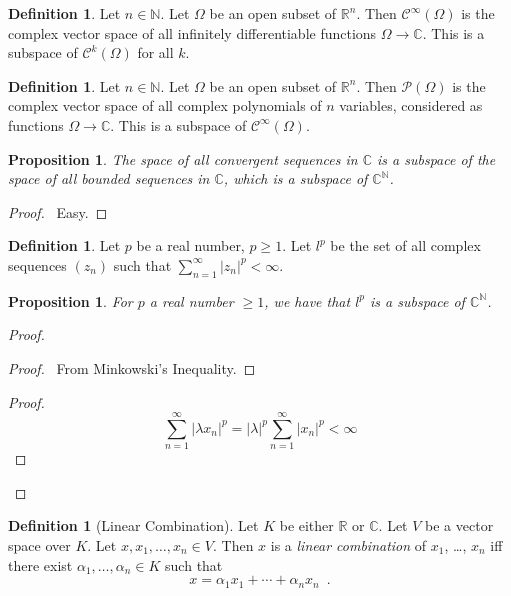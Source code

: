 \documentclass{book}
\let\qed\relax
\newtheorem{prop}[ax]{Proposition}
\theoremstyle{definition}
\newtheorem{df}[ax]{Definition}
\begin{document}
\begin{df}
Let $n \in \mathbb{N}$. Let $\Omega$ be an open subset of $\mathbb{R}^n$. Then $\mathcal{C}^\infty(\Omega)$ is the complex vector space of all infinitely differentiable functions $\Omega \rightarrow \mathbb{C}$. This is a subspace of $\mathcal{C}^k(\Omega)$ for all $k$.
\end{df}

\begin{df}
Let $n \in \mathbb{N}$. Let $\Omega$ be an open subset of $\mathbb{R}^n$. Then $\mathcal{P}(\Omega)$ is the complex vector space of all complex polynomials of $n$ variables, considered as functions $\Omega \rightarrow \mathbb{C}$. This is a subspace of $\mathcal{C}^\infty(\Omega)$.
\end{df}

\begin{prop}
The space of all convergent sequences in $\mathbb{C}$ is a subspace of the space of all bounded sequences in $\mathbb{C}$, which is a subspace of $\mathbb{C}^\mathbb{N}$.
\end{prop}

\begin{proof}
\pf\ Easy. \qed
\end{proof}

\begin{df}
Let $p$ be a real number, $p \geq 1$. Let $l^p$ be the set of all complex sequences $(z_n)$ such that $\sum_{n=1}^\infty |z_n|^p < \infty$.
\end{df}

\begin{prop}
For $p$ a real number $\geq 1$, we have that $l^p$ is a subspace of $\mathbb{C}^\mathbb{N}$.
\end{prop}

\begin{proof}
\pf
{}
\begin{proof}
	\pf\ From Minkowski's Inequality.
\end{proof}
\begin{proof}
	\pf
	\[ \sum_{n=1}^\infty |\lambda x_n|^p = |\lambda|^p \sum_{n=1}^\infty |x_n|^p < \infty \]
\end{proof}
\qed
\end{proof}

\begin{df}[Linear Combination]
Let $K$ be either $\mathbb{R}$ or $\mathbb{C}$. Let $V$ be a vector space over $K$. Let $x, x_1, \ldots, x_n \in V$. Then $x$ is a \emph{linear combination} of $x_1$, \ldots, $x_n$ iff there exist $\alpha_1, \ldots, \alpha_n \in K$ such that
\[ x = \alpha_1 x_1 + \cdots + \alpha_n x_n \enspace . \]
\end{df}
\end{document}

